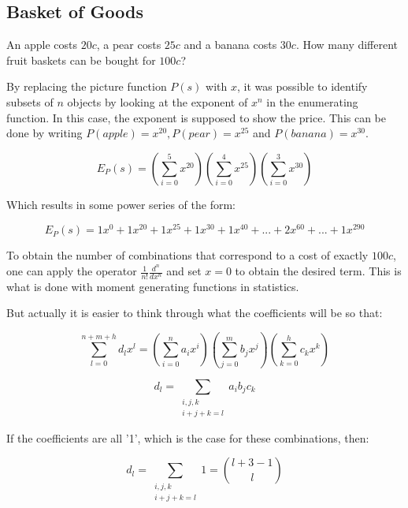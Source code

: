 \subsection{Basket of Goods}

An apple costs $20c$, a pear costs $25c$ and a banana costs $30c$. How many different fruit baskets can be bought for $100c$?

By replacing the picture function $P(s)$ with $x$, it was possible to identify subsets of $n$ objects by looking at the exponent of $x^n$ in the enumerating function. In this case, the exponent is supposed to show the price. This can be done by writing $P(apple) = x^{20}, P(pear) = x^{25}$ and $P(banana) = x^{30}$. 

\begin{equation}
E_P(s) = \left( \sum_{i=0}^5 x^{20} \right)\left( \sum_{i=0}^4 x^{25} \right)\left( \sum_{i=0}^3 x^{30} \right)
\end{equation}

Which results in some power series of the form:

\begin{equation}
E_P(s) = 1x^0 + 1x^{20} + 1x^{25} + 1x^{30} + 1x^{40} +... + 2x^{60} + ... + 1x^{290}
\end{equation}

To obtain the number of combinations that correspond to a cost of exactly $100c$, one can apply the operator $\frac{1}{n!}\frac{d^n}{dx^n}$ and set $x=0$ to obtain the desired term. This is what is done with moment generating functions in statistics. 

But actually it is easier to think through what the coefficients will be so that:

\begin{equation}
\sum_{l=0}^{n+m+h}d_l x^l = \left(\sum_{i=0}^n a_i x^i\right)\left(\sum_{j=0}^m b_j x^j\right)\left(\sum_{k=0}^h c_k x^k\right)
\end{equation}

\begin{equation}
d_l = \sum_{\begin{array}{c}i,j,k\\i+j+k=l\end{array}} a_i b_j c_k
\end{equation}

If the coefficients are all '1', which is the case for these combinations, then:

\begin{equation}
d_l = \sum_{\begin{array}{c}i,j,k\\i+j+k=l\end{array}} 1 = {l + 3 - 1 \choose l}
\end{equation}

